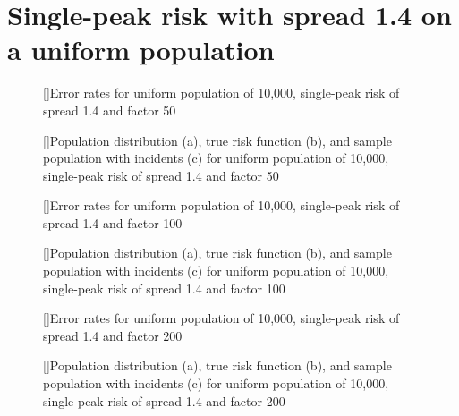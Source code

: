 {\section{Single-peak risk with spread 1.4 on a uniform population}
\label{sec:app:results_unif_1.4_1h}


\begin{figure}[!htb]
    
    []{Error rates for uniform population of 10,000, single-peak risk of \gls{spread} 1.4 and \gls{factor} 50}
    \label{tab:mean_error_rates:unif_50_1.4_1h}
    
    []{Population distribution (a), true risk function (b), and sample population with incidents (c) for uniform population of 10,000, single-peak risk of \gls{spread} 1.4 and \gls{factor} 50}
    \label{fig:distributions:unif_50_1.4_1h}    
\end{figure}



\begin{figure}[!htb]
    
    []{Error rates for uniform population of 10,000, single-peak risk of \gls{spread} 1.4 and \gls{factor} 100}
    \label{tab:mean_error_rates:unif_100_1.4_1h}
    
    []{Population distribution (a), true risk function (b), and sample population with incidents (c) for uniform population of 10,000, single-peak risk of \gls{spread} 1.4 and \gls{factor} 100}
    \label{fig:distributions:unif_100_1.4_1h}    
\end{figure}



\begin{figure}[!htb]
    
    []{Error rates for uniform population of 10,000, single-peak risk of \gls{spread} 1.4 and \gls{factor} 200}
    \label{tab:mean_error_rates:unif_200_1.4_1h}
    
    []{Population distribution (a), true risk function (b), and sample population with incidents (c) for uniform population of 10,000, single-peak risk of \gls{spread} 1.4 and \gls{factor} 200}
    \label{fig:distributions:unif_200_1.4_1h}    
\end{figure}


}

